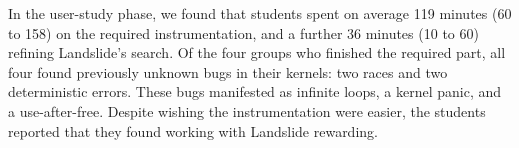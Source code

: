 In the user-study phase, we found that students spent on average 119 minutes (60 to 158) on the required instrumentation, and a further 36 minutes (10 to 60) refining Landslide's search.
Of the four groups who finished the required part, all four found previously unknown bugs in their kernels: two races and two deterministic errors.
These bugs manifested as infinite loops, a kernel panic, and a use-after-free.
Despite wishing the instrumentation were easier, the students reported that they found working with Landslide rewarding.
